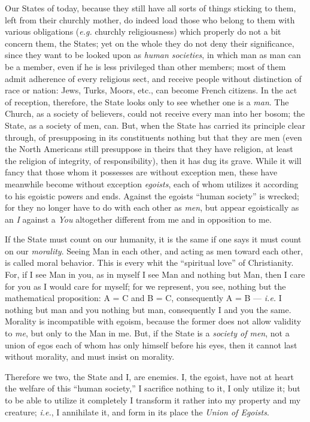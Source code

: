 Our States of today, because they still have all sorts of things sticking to 
them, left from their churchly mother, do indeed load those who belong to them 
with various obligations (\textit{e.g.} churchly religiousness) which 
properly do not a bit concern them, the States; yet on the whole they do not 
deny their significance, since they want to be looked upon as \textit{human 
societies}, in which man as man can be a member, even if he is less privileged 
than other members; most of them admit adherence of every religious sect, and 
receive people without distinction of race or nation: Jews, Turks, Moors, 
etc., can become French citizens. In the act of reception, therefore, the 
State looks only to see whether one is a \textit{man}. The Church, as a 
society of believers, could not receive every man into her bosom; the State, 
as a society of men, can. But, when the State has carried its principle clear 
through, of presupposing in its constituents nothing but that they are men 
(even the North Americans still presuppose in theirs that they have religion, 
at least the religion of integrity, of responsibility), then it has dug its 
grave. While it will fancy that those whom it possesses are without exception 
men, these have meanwhile become without exception \textit{egoists}, each of 
whom utilizes it according to his egoistic powers and ends. Against the 
egoists ``human society'' is wrecked; for they no longer have to do with 
each other as \textit{men}, but appear egoistically as an \textit{I} against a 
\textit{You} altogether different from me and in opposition to me.

If the State must count on our humanity, it is the same if one says it must 
count on our \textit{morality}. Seeing Man in each other, and acting as men 
toward each other, is called moral behavior. This is every whit the 
``spiritual love'' of Christianity. For, if I see Man in you, as in myself I 
see Man and nothing but Man, then I care for you as I would care for myself; 
for we represent, you see, nothing but the mathematical proposition: A = C and 
B = C, consequently A = B --- \textit{i.e.} I nothing but man and you nothing 
but man, consequently I and you the same. Morality is incompatible with 
egoism, because the former does not allow validity to \textit{me}, but only to 
the Man in me. But, if the State is a \textit{society of men}, not a union of 
egos each of whom has only himself before his eyes, then it cannot last 
without morality, and must insist on morality.

Therefore we two, the State and I, are enemies. I, the egoist, have not at 
heart the welfare of this ``human society,'' I sacrifice nothing to it, I 
only utilize it; but to be able to utilize it completely I transform it rather 
into my property and my creature; \textit{i.e.}, I annihilate it, and form in 
its place the \textit{Union of Egoists}.

